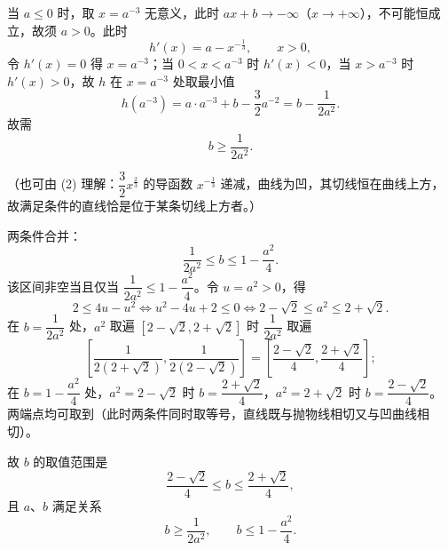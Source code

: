 \begin{answer}
当 $a \leqslant 0$ 时，取 $x = a^{-3}$ 无意义，此时 $ax + b \to -\infty$（$x \to +\infty$），不可能恒成立，故须 $a > 0$。此时
\nopagebreak[4]
\[
h'(x) = a - x^{-\frac{1}{3}},\qquad x > 0,
\]
令 $h'(x) = 0$ 得 $x = a^{-3}$；当 $0 < x < a^{-3}$ 时 $h'(x) < 0$，当 $x > a^{-3}$ 时 $h'(x) > 0$，故 $h$ 在 $x = a^{-3}$ 处取最小值
\nopagebreak[4]
\[
h\left(a^{-3}\right) = a\cdot a^{-3} + b - \frac{3}{2}a^{-2} = b - \frac{1}{2a^2}.
\]
故需
\nopagebreak[4]
\[
b \geqslant \frac{1}{2a^2}.
\]

（也可由 (2) 理解：$\dfrac{3}{2}x^{\frac{2}{3}}$ 的导函数 $x^{-\frac{1}{3}}$ 递减，曲线为凹，其切线恒在曲线上方，故满足条件的直线恰是位于某条切线上方者。）

两条件合并：
\nopagebreak[4]
\[
\frac{1}{2a^2} \leqslant b \leqslant 1 - \frac{a^2}{4}.
\]
该区间非空当且仅当 $\dfrac{1}{2a^2} \leqslant 1 - \dfrac{a^2}{4}$。令 $u = a^2 > 0$，得
\nopagebreak[4]
\[
2 \leqslant 4u - u^2 \iff u^2 - 4u + 2 \leqslant 0 \iff 2-\sqrt{2} \leqslant a^2 \leqslant 2+\sqrt{2}.
\]
在 $b = \dfrac{1}{2a^2}$ 处，$a^2$ 取遍 $\left[2-\sqrt{2}, 2+\sqrt{2}\right]$ 时 $\dfrac{1}{2a^2}$ 取遍
\nopagebreak[4]
\[
\left[\frac{1}{2(2+\sqrt{2})}, \frac{1}{2(2-\sqrt{2})}\right] = \left[\frac{2-\sqrt{2}}{4}, \frac{2+\sqrt{2}}{4}\right];
\]
在 $b = 1 - \dfrac{a^2}{4}$ 处，$a^2 = 2-\sqrt{2}$ 时 $b = \dfrac{2+\sqrt{2}}{4}$，$a^2 = 2+\sqrt{2}$ 时 $b = \dfrac{2-\sqrt{2}}{4}$。两端点均可取到（此时两条件同时取等号，直线既与抛物线相切又与凹曲线相切）。

故 $b$ 的取值范围是
\nopagebreak[4]
\[
\frac{2-\sqrt{2}}{4} \leqslant b \leqslant \frac{2+\sqrt{2}}{4},
\]
且 $a$、$b$ 满足关系
\nopagebreak[4]
\[
b \geqslant \frac{1}{2a^2},\qquad b \leqslant 1 - \frac{a^2}{4}.
\]




\end{answer}
